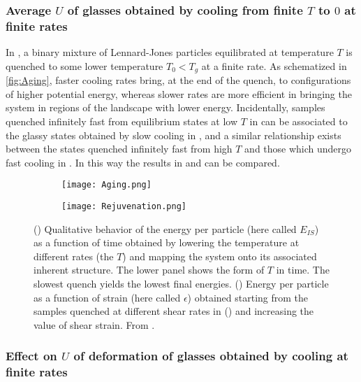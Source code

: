 \subsubsection{Average $U$ of glasses obtained by cooling from finite $T$ to $0$ at finite rates}
In \cite{utz2000atomistic}, a binary mixture of Lennard-Jones particles equilibrated at temperature $T$ is quenched to some lower temperature $T_{0}<T_{g}$ at a finite rate. As schematized in \autoref{fig:Aging}, faster cooling rates bring, at the end of the quench, to configurations of higher potential energy, whereas slower rates are more efficient in bringing the system in regions of the landscape with lower energy. Incidentally, samples quenched infinitely fast from equilibrium states at low $T$ in \cite{lacks2004energy} can be associated to the glassy states obtained by slow cooling in \cite{utz2000atomistic}, and a similar relationship exists between the states quenched infinitely fast from high $T$ and those which undergo fast cooling in \cite{utz2000atomistic}. In this way the results in \cite{utz2000atomistic} and \cite{lacks2004energy} can be compared.

\begin{figure} 
	\centering
	\begin{subfigure}[b]{0.45\textwidth}
		\centering
		\texttt{[image: Aging.png]} 
		\caption{\label{fig:Aging}}
	\end{subfigure}
	\centering
	\begin{subfigure}[b]{0.45\textwidth}
		\centering
		\texttt{[image: Rejuvenation.png]} 
		\caption{\label{fig:Rejuvenation}}
	\end{subfigure} 
\caption{() Qualitative behavior of the energy per particle (here called $E_{IS}$) as a function of time obtained by lowering the temperature at different rates (the $T$) and mapping the system onto its associated inherent structure. The lower panel shows the form of $T$ in time. The slowest quench yields the lowest final energies. () Energy per particle as a function of strain (here called $\epsilon$) obtained starting from the samples quenched at different shear rates in () and increasing the value of shear strain. From \cite{utz2000atomistic}.}
\end{figure}

\subsubsection{Effect on $U$ of deformation of glasses obtained by cooling at finite rates}

